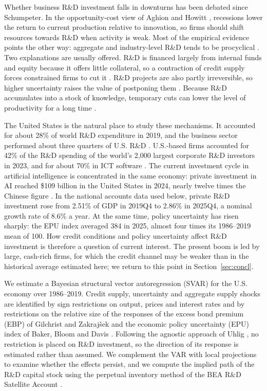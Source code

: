 \documentclass[conference]{IEEEtran}
\begin{document}
Whether business R\&D investment falls in downturns has been debated since
Schumpeter. In the opportunity-cost view of Aghion and Howitt
\cite{aghionhowitt1992}, recessions lower the return to current production
relative to innovation, so firms should shift resources towards R\&D when
activity is weak. Most of the empirical evidence points the other way:
aggregate and industry-level R\&D tends to be procyclical
\cite{rafferty2003,barlevy2007,ouyang2011,fabrizio2014}. Two explanations are
usually offered. R\&D is financed largely from internal funds and equity
because it offers little collateral, so a contraction of credit supply forces
constrained firms to cut it \cite{himmelberg1994,brown2009,aghion2012}.
R\&D projects are also partly irreversible, so higher uncertainty raises the
value of postponing them \cite{bernanke1983,bloom2009}. Because R\&D
accumulates into a stock of knowledge, temporary cuts can lower the level of
productivity for a long time \cite{anzoategui2019,cerra2023}.

The United States is the natural place to study these mechanisms. It
accounted for about 28\% of world R\&D expenditure in 2019, and the business
sector performed about three quarters of U.S. R\&D \cite{nsb2022}. U.S.-based
firms accounted for 42\% of the R\&D spending of the world's 2{,}000 largest
corporate R\&D investors in 2023, and for about 70\% in ICT software
\cite{nindl2024}. The current investment cycle in artificial intelligence is
concentrated in the same economy: private investment in AI reached \$109
billion in the United States in 2024, nearly twelve times the Chinese figure
\cite{maslej2025}. In the national accounts data used below, private R\&D
investment rose from 2.51\% of GDP in 2019Q4 to 2.86\% in 2025Q4, a nominal
growth rate of 8.6\% a year. At the same time, policy uncertainty has
risen sharply: the EPU index averaged 384 in 2025, almost four times its
1986--2019 mean of 100. How credit conditions and policy uncertainty affect
R\&D investment is therefore a question of current interest. The present boom is led by large, cash-rich firms, for which the
credit channel may be weaker than in the historical average estimated here; we
return to this point in Section~\ref{sec:concl}.

We estimate a Bayesian structural vector autoregression (SVAR) for the U.S.
economy over 1986--2019. Credit supply, uncertainty and aggregate supply
shocks are identified by sign restrictions on output, prices and interest
rates and by restrictions on the relative size of the responses of the excess
bond premium (EBP) of Gilchrist and Zakraj\v{s}ek \cite{gilchrist2012} and the
economic policy uncertainty (EPU) index of Baker, Bloom and Davis
\cite{baker2016}. Following the agnostic approach of Uhlig \cite{uhlig2005}, no
restriction is placed on R\&D investment, so the direction of its response is
estimated rather than assumed. We complement the VAR with local projections
\cite{jorda2005} to examine whether the effects persist, and we compute the
implied path of the R\&D capital stock using the perpetual inventory method of
the BEA R\&D Satellite Account \cite{sliker2007}.
\end{document}
